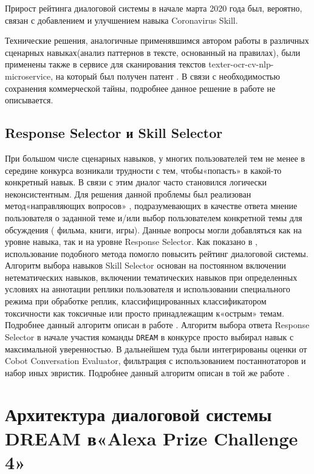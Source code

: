  Прирост рейтинга диалоговой системы в начале марта 2020 года был, вероятно, связан с добавлением и улучшением навыка Coronavirus Skill.

Технические решения, аналогичные применявшимся автором работы в различных сценарных навыках(анализ паттернов в тексте, основанный на правилах), были применены также в сервисе для сканирования текстов texter-ocr-cv-nlp-microservice, на который был получен патент \cite{Дуплякин_Дмитрий_Ондар_Ушаков_2021}. В связи с необходимостью сохранения коммерческой тайны, подробнее данное решение в работе не описывается.

\subsection{Response Selector и Skill Selector}

При большом числе сценарных навыков, у многих пользователей тем не менее в середине конкурса возникали трудности с тем, чтобы«попасть» в какой-то конкретный навык. В связи с этим диалог часто становился логически неконсистентным. Для решения данной проблемы был реализован метод«направляющих вопросов» , подразумевающих в качестве ответа мнение пользователя о заданной теме и/или выбор пользователем конкретной темы для обсуждения ( фильма, книги, игры). Данные вопросы могли добавляться как на уровне навыка, так и на уровне Response Selector. Как показано в \cite{dream1}, использование подобного метода помогло повысить рейтинг диалоговой системы.
Алгоритм выбора навыков Skill Selector основан на постоянном включении нетематических навыков, включении тематических навыков при определенных условиях на аннотации реплики пользователя и использовании специального режима при обработке реплик, классифицированных классификатором токсичности как токсичные или просто принадлежащим к«острым» темам. Подробнее данный алгоритм описан в работе \cite{dilya_thesis}.
Алгоритм выбора ответа Response Selector в начале участия команды \texttt{DREAM} в конкурсе просто выбирал навык с максимальной уверенностью. В дальнейшем туда были интегрированы оценки от Cobot Conversation Evaluator, фильтрация с использованием постаннотаторов и набор иных эвристик. Подробнее данный алгоритм описан в той же работе \cite{dilya_thesis}.

\section{Архитектура диалоговой системы {DREAM} в«Alexa Prize Challenge 4»}


